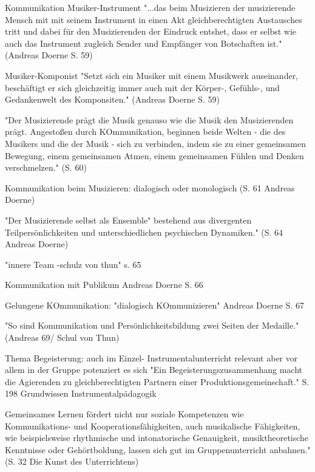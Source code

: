 Kommunikation Musiker-Instrument
"...das beim Musizieren der musizierende Mensch mit mit seinem Instrument in
einen Akt gleichberechtigten Austausches tritt und dabei für den Musizierenden
der Eindruck entshet, dass er selbst wie auch das Instrument zugleich Sender und
Empfänger von Botschaften ist." (Andreas Doerne S. 59)


Musiker-Komponist
"Setzt sich ein Musiker mit einem Musikwerk auseinander, beschäftigt er sich
gleichzeitig immer auch mit der Körper-, Gefühls-, und Gedankenwelt des
Komponsiten." (Andreas Doerne S. 59)

"Der Musizierende prägt die Musik genauso wie die Musik den Musizierenden prägt.
Angestoßen durch KOmmunikation, beginnen beide Welten - die des Musikers und die
der Musik - sich zu verbinden, indem sie zu einer gemeinsamen Bewegung, einem
gemeinsamen Atmen, einem gemeinsamen Fühlen und Denken verschmelzen." (S. 60)

Kommunikation beim Musizieren: dialogisch oder monologisch (S. 61 Andreas Doerne)


"Der Musizierende selbst als Ensemble" bestehend aus divergenten Teilpersönlichkeiten und
unterschiedlichen psychischen Dynamiken." (S. 64 Andreas Doerne)

"innere Team -schulz von thun" s. 65

Kommunikation mit Publikum Andreas Doerne S. 66

Gelungene KOmmunikation: "dialogisch KOmmunizieren" Andreas Doerne S. 67

"So sind Kommunikation und Persönlichkeitsbildung zwei Seiten der Medaille."
(Andreas 69/ Schul von Thun)


Thema Begeisterung: auch im Einzel- Instrumentalunterricht relevant aber vor allem in der Gruppe potenziert es
sich "Ein Begeisterungszusammenhang macht die Agierenden zu gleichberechtigten
Partnern einer Produktionsgemeinschaft." S. 198 Grundwissen
Instrumentalpädagogik

Gemeinsames Lernen fördert nicht nur soziale Kompetenzen wie Kommunikations- und
Kooperationsfähigkeiten, auch musikalische Fähigkeiten, wie beispielsweise
rhythmische und intonatorische Genauigkeit, musiktheoretische Kenntnisse oder
Gehörtboldung, lassen sich gut im Gruppenunterricht anbahnen." (S. 32 Die Kunst
des Unterrichtens)


